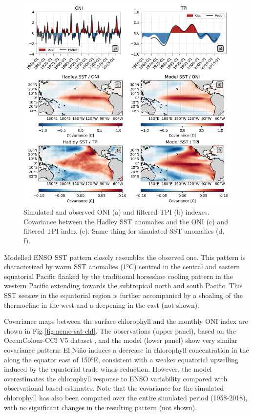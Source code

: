 \begin{figure}
	\centering
	\includegraphics[scale=0.4]{figs/fig1.png}
	\caption{Simulated and observed ONI (a) and filtered TPI (b) indexes. Covariance between the Hadley SST anomalies and the ONI (c) and filtered TPI index (e). Same thing for simulated SST anomalies (d, f).}
	\label{fig:nemo-had-sst}
\end{figure}

Modelled ENSO SST  pattern closely resembles the observed one. This pattern is characterized by warm SST anomalies (1°C) centred in the central and eastern equatorial Pacific  flanked by the traditional horseshoe cooling pattern in the western Pacific extending towards the subtropical north and south Pacific. This SST seesaw in the equatorial region is further accompanied by a shoaling of the thermocline in the west and a deepening in the east (not shown).

Covariance maps between the surface chlorophyll and the monthly ONI index are shown in Fig \ref{fig:nemo-sat-chl}. The observations (upper panel), based on the  OceanColour-CCI V5 dataset \citep{sathyendranathOceanColourTimeSeries2019},  and the model (lower panel) show very similar covariance pattern: El Niño induces a decrease in chlorophyll concentration in the along the equator east of 150°E, consistent with a weaker equatorial upwelling induced by the equatorial trade winds reduction. However, the model overestimates the chlorophyll response to ENSO variability compared with observational based estimates. Note that the covariance for the simulated chlorophyll has also been computed over the entire simulated period (1958-2018), with no significant changes in the resulting pattern (not shown).

